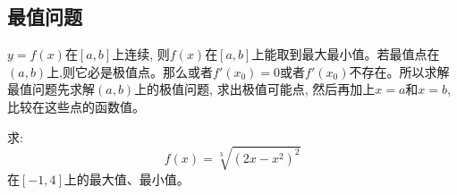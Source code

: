 \subsection{最值问题}
$y = f(x)$在$[a, b]$上连续, 则$f(x)$在$[a, b]$上能取到最大最小值。若最值点在$(a, b)$上,则它必是极值点。那么或者$f'(x_0) = 0$或者$f'(x_0)$不存在。所以求解最值问题先求解$(a, b)$上的极值问题, 求出极值可能点, 然后再加上$x = a$和$x = b$, 比较在这些点的函数值。

\begin{example}
    求:
    \begin{equation*}
        f(x) = \sqrt[3]{(2x-x^2)^2}
    \end{equation*}
    在$[-1, 4]$上的最大值、最小值。
\end{example}
\begin{solution}
    
\end{solution}